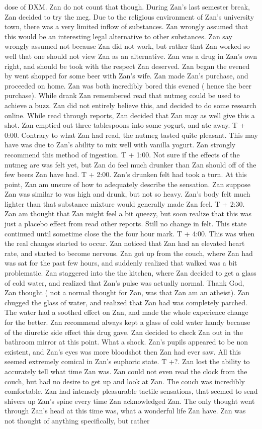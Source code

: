 \documentclass[12pt]{book}
\begin{document}
dose of DXM. Zan do not count that though. During Zan's last semester break, Zan decided to try the meg. Due to the religious environment of Zan's university town, there was a very limited inflow of substances. Zan wrongly assumed that this would be an interesting legal alternative to other substances. Zan say wrongly assumed not because Zan did not work, but rather that Zan worked so well that one should not view Zan as an alternative. Zan was a drug in Zan's own right, and should be took with the respect Zan deserved. Zan began the evened by went shopped for some beer with Zan's wife. Zan made Zan's purchase, and proceeded on home. Zan was both incredibly bored this evened ( hence the beer purchase). While drank Zan remembered read that nutmeg could be used to achieve a buzz. Zan did not entirely believe this, and decided to do some research online. While read through reports, Zan decided that Zan may as well give this a shot. Zan emptied out three tablespoons into some yogurt, and ate away. T + 0:00. Contrary to what Zan had read, the nutmeg tasted quite pleasant. This may have was due to Zan's ability to mix well with vanilla yogurt. Zan strongly recommend this method of ingestion. T + 1:00. Not sure if the effects of the nutmeg are was felt yet, but Zan do feel much drunker than Zan should off of the few beers Zan have had. T + 2:00. Zan's drunken felt had took a turn. At this point, Zan am unsure of how to adequately describe the sensation. Zan suppose Zan was similar to was high and drunk, but not so heavy. Zan's body felt much lighter than that substance mixture would generally made Zan feel. T + 2:30. Zan am thought that Zan might feel a bit queezy, but soon realize that this was just a placebo effect from read other reports. Still no change in felt. This state continued until sometime close the the four hour mark. T + 4:00. This was when the real changes started to occur. Zan noticed that Zan had an elevated heart rate, and started to become nervous. Zan got up from the couch, where Zan had was sat for the past few hours, and suddenly realized that walked was a bit problematic. Zan staggered into the the kitchen, where Zan decided to get a glass of cold water, and realized that Zan's pulse was actually normal. Thank God, Zan thought ( not a normal thought for Zan, was that Zan am an atheist). Zan chugged the glass of water, and realized that Zan had was completely parched. The water had a soothed effect on Zan, and made the whole experience change for the better. Zan recommend always kept a glass of cold water handy because of the diuretic side effect this drug gave. Zan decided to check Zan out in the bathroom mirror at this point. What a shock. Zan's pupils appeared to be non existent, and Zan's eyes was more bloodshot then Zan had ever saw. All this seemed extremely comical in Zan's euphoric state. T +?. Zan lost the ability to accurately tell what time Zan was. Zan could not even read the clock from the couch, but had no desire to get up and look at Zan. The couch was incredibly comfortable. Zan had intensely pleasurable tactile sensations, that seemed to send shivers up Zan's spine every time Zan acknowledged Zan. The only thought went through Zan's head at this time was, what a wonderful life Zan have. Zan was not thought of anything specifically, but rather 
\end{document}
